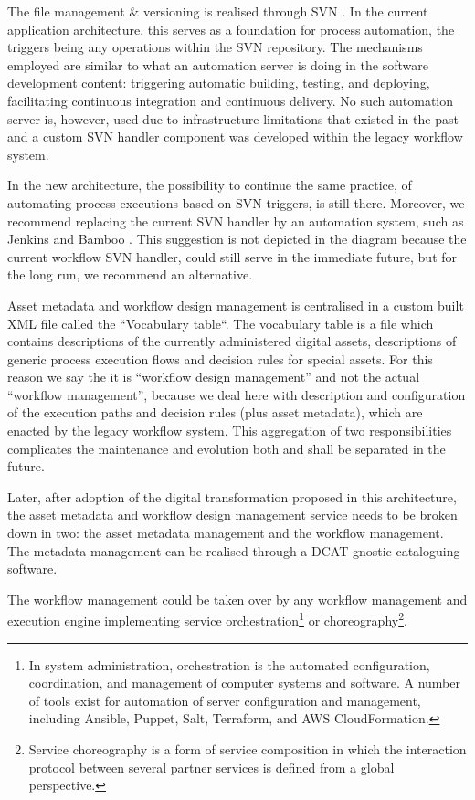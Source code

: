 	The file management \& versioning is realised through SVN \cite{svn}. In the current application architecture, this serves as a foundation for process automation, the triggers being any operations within the SVN repository. The mechanisms employed are similar to what an automation server is doing in the software development content: triggering automatic building, testing, and deploying, facilitating continuous integration and continuous delivery. No such automation server is, however, used due to infrastructure limitations that existed in the past and a custom SVN handler component was developed within the legacy workflow system. 
	
	In the new architecture, the possibility to continue the same practice, of automating process executions based on SVN triggers, is still there. Moreover, we recommend replacing the current SVN handler by an automation system, such as Jenkins \citep{jenkins} and Bamboo \cite{bamboo}. This suggestion is not depicted in the diagram because the current workflow SVN handler, could still serve in the immediate future, but for the long run, we recommend an alternative.
	
	Asset metadata and workflow design management is centralised in a custom built XML file called the ``Vocabulary table``. The vocabulary table is a file which contains descriptions of the currently administered digital assets, descriptions of generic process execution flows and decision rules for special assets. For this reason we say the it is ``workflow design management'' and not the actual ``workflow management'',  because we deal here with description and configuration of the execution paths and decision rules (plus asset metadata), which are enacted by the legacy workflow system. This aggregation of two responsibilities complicates the maintenance and evolution both and shall be separated in the future.  
	
	Later, after adoption of the digital transformation proposed in this architecture, the asset metadata and workflow design management service needs to be broken down in two: the asset metadata management and the workflow management. The metadata management can be realised through a DCAT \citep{dcat2} gnostic cataloguing software. 
	
	The workflow management could be taken over by any workflow management and execution engine implementing service orchestration\footnote{In system administration, orchestration is the automated configuration, coordination, and management of computer systems and software. A number of tools exist for automation of server configuration and management, including Ansible, Puppet, Salt, Terraform, and AWS CloudFormation.} or choreography\footnote{Service choreography is a form of service composition in which the interaction protocol between several partner services is defined from a global perspective.}. 
	
